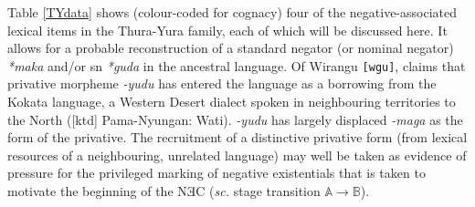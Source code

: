 Table \ref{TYdata} shows (colour-coded for cognacy) four of the negative-associated lexical items in the Thura-Yura family, each of which will be discussed here. It allows for a probable reconstruction of a standard negator (or nominal negator) \textit{*maka} and/or \acrshort{sn} \textit{*guda} in the ancestral language. Of Wirangu \texttt{[wgu]}, \citet[57]{Hercus1999} claims that privative morpheme \textit{-yudu} has entered the language as a borrowing from the Kokata language, a Western Desert dialect spoken in neighbouring territories to the North ([\gls{ktd}] Pama-Nyungan: Wati). \textit{-yudu} has largely displaced \textit{-maga} as the form of the privative. The recruitment of a distinctive privative form (from lexical resources of a neighbouring, unrelated language) may well be taken as evidence of pressure for the privileged marking of negative existentials that is taken to motivate the beginning of the NƎC (\textit{sc.} stage transition $\mathbb{A\to B}$).

